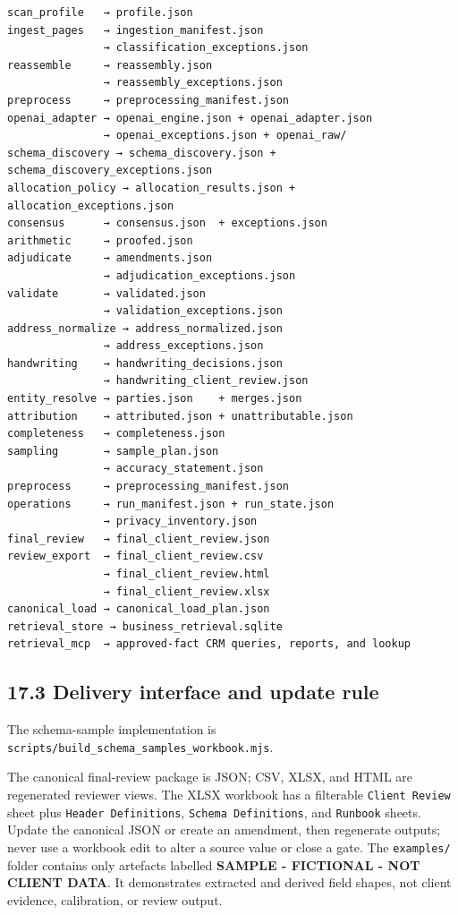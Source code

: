 \documentclass[
]{article}
\begin{document}
\begin{verbatim}
scan_profile   → profile.json
ingest_pages   → ingestion_manifest.json
               → classification_exceptions.json
reassemble     → reassembly.json
               → reassembly_exceptions.json
preprocess     → preprocessing_manifest.json
openai_adapter → openai_engine.json + openai_adapter.json
               → openai_exceptions.json + openai_raw/
schema_discovery → schema_discovery.json + schema_discovery_exceptions.json
allocation_policy → allocation_results.json + allocation_exceptions.json
consensus      → consensus.json  + exceptions.json
arithmetic     → proofed.json
adjudicate     → amendments.json
               → adjudication_exceptions.json
validate       → validated.json
               → validation_exceptions.json
address_normalize → address_normalized.json
               → address_exceptions.json
handwriting    → handwriting_decisions.json
               → handwriting_client_review.json
entity_resolve → parties.json    + merges.json
attribution    → attributed.json + unattributable.json
completeness   → completeness.json
sampling       → sample_plan.json
               → accuracy_statement.json
preprocess     → preprocessing_manifest.json
operations     → run_manifest.json + run_state.json
               → privacy_inventory.json
final_review   → final_client_review.json
review_export  → final_client_review.csv
               → final_client_review.html
               → final_client_review.xlsx
canonical_load → canonical_load_plan.json
retrieval_store → business_retrieval.sqlite
retrieval_mcp  → approved-fact CRM queries, reports, and lookup
\end{verbatim}

\subsection{17.3 Delivery interface and update
rule}\label{delivery-interface-and-update-rule}

The schema-sample implementation is
\texttt{scripts/\allowbreak{}build\_\allowbreak{}schema\_\allowbreak{}samples\_\allowbreak{}workbook.mjs}.

The canonical final-review package is JSON; CSV, XLSX, and HTML are
regenerated reviewer views. The XLSX workbook has a filterable
\texttt{Client\ Review} sheet plus \texttt{Header\ Definitions},
\texttt{Schema\ Definitions}, and \texttt{Runbook} sheets. Update the
canonical JSON or create an amendment, then regenerate outputs; never
use a workbook edit to alter a source value or close a gate. The
\texttt{examples/\allowbreak{}} folder contains only artefacts labelled
\textbf{SAMPLE - FICTIONAL - NOT CLIENT DATA}. It demonstrates extracted
and derived field shapes, not client evidence, calibration, or review
output.
\end{document}
